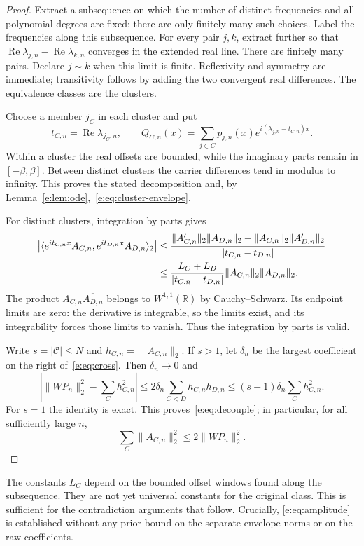 \documentclass[11pt,a4paper]{article}
\numberwithin{equation}{section}
\theoremstyle{definition}\newtheorem{definition}[theorem]{Definition}
\theoremstyle{remark}\newtheorem{remark}[theorem]{Remark}
\newcommand{\R}{\mathbb R}\newcommand{\C}{\mathbb C}\newcommand{\N}{\mathbb N}
\newcommand{\ip}[2]{\langle#1,#2\rangle}\newcommand{\norm}[1]{\lVert#1\rVert}\newcommand{\abs}[1]{\lvert#1\rvert}
\DeclareMathOperator{\Rea}{Re}\DeclareMathOperator{\Ima}{Im}
\begin{document}
\begin{proof}
Extract a subsequence on which the number of distinct frequencies and all
polynomial degrees are fixed; there are only finitely many such choices.
Label the frequencies along this subsequence. For every pair $j,k$, extract
further so that $\Rea\lambda_{j,n}-\Rea\lambda_{k,n}$ converges in the
extended real line. There are finitely many pairs. Declare $j\sim k$ when
this limit is finite. Reflexivity and symmetry are immediate; transitivity
follows by adding the two convergent real differences. The equivalence
classes are the clusters.

Choose a member $j_C$ in each cluster and put
\[
 t_{C,n}=\Rea\lambda_{j_C,n},\qquad
 Q_{C,n}(x)=\sum_{j\in C}p_{j,n}(x)
 e^{i(\lambda_{j,n}-t_{C,n})x}.
\]
Within a cluster the real offsets are bounded, while the imaginary parts
remain in $[-\beta,\beta]$. Between distinct clusters the carrier differences
tend in modulus to infinity. This proves the stated decomposition and,
by Lemma~\ref{e:lem:ode},~\eqref{e:eq:cluster-envelope}.

For distinct clusters, integration by parts gives
\begin{align}\label{e:eq:cross}
 \left|\ip{e^{it_{C,n}x}A_{C,n}}{e^{it_{D,n}x}A_{D,n}}_2\right|
 &\le\frac{\norm{A_{C,n}'}_2\norm{A_{D,n}}_2+
 \norm{A_{C,n}}_2\norm{A_{D,n}'}_2}{|t_{C,n}-t_{D,n}|}\notag\\
 &\le\frac{L_C+L_D}{|t_{C,n}-t_{D,n}|}
 \norm{A_{C,n}}_2\norm{A_{D,n}}_2.
\end{align}
The product $A_{C,n}\overline{A_{D,n}}$ belongs to $W^{1,1}(\R)$ by
Cauchy--Schwarz. Its endpoint limits are zero: the derivative is integrable,
so the limits exist, and its integrability forces those limits to vanish.
Thus the integration by parts is valid.

Write $s=|\mathcal C|\le N$ and $h_{C,n}=\norm{A_{C,n}}_2$. If $s>1$,
let $\delta_n$ be the largest coefficient on the right of~\eqref{e:eq:cross}.
Then $\delta_n\to0$ and
\[
 \left|\norm{WP_n}_2^2-\sum_C h_{C,n}^2\right|
 \le2\delta_n\sum_{C<D}h_{C,n}h_{D,n}
 \le(s-1)\delta_n\sum_C h_{C,n}^2.
\]
For $s=1$ the identity is exact. This proves~\eqref{e:eq:decouple}; in
particular, for all sufficiently large $n$,
\begin{equation}\label{e:eq:amplitude}
 \sum_C\norm{A_{C,n}}_2^2\le2\norm{WP_n}_2^2.
\end{equation}
\end{proof}

The constants $L_C$ depend on the bounded offset windows found along the
subsequence. They are not yet universal constants for the original class.
This is sufficient for the contradiction arguments that follow. Crucially,
\eqref{e:eq:amplitude} is established without any prior bound on the separate
envelope norms or on the raw coefficients.
\end{document}
